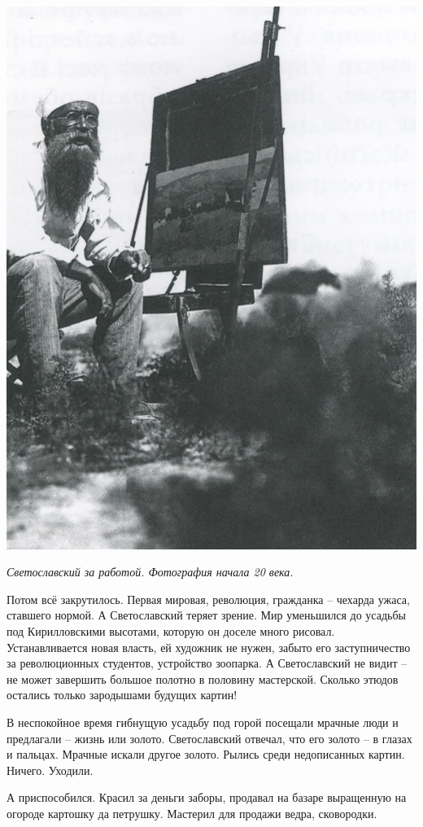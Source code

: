 \begin{center}
\includegraphics[width=0.80\linewidth]{chast-kirvys/svetosl/sveto-port.jpg}

\textit{Светославский за работой. Фотография начала 20 века.}
\end{center}

\newpage

Потом всё закрутилось. Первая мировая, революция, гражданка – чехарда ужаса, ставшего нормой. А Светославский теряет зрение. Мир уменьшился до усадьбы под Кирилловскими высотами, которую он доселе много рисовал. Устанавливается новая власть, ей художник не нужен, забыто его заступничество за революционных студентов, устройство зоопарка. А Светославский не видит – не может завершить большое полотно в половину мастерской. Сколько этюдов остались только зародышами будущих картин!

В неспокойное время гибнущую усадьбу под горой посещали мрачные люди и предлагали – жизнь или золото. Светославский отвечал, что его золото – в глазах и пальцах. Мрачные искали другое золото. Рылись среди недописанных картин. Ничего. Уходили.

А приспособился. Красил за деньги заборы, продавал на базаре выращенную на огороде картошку да петрушку. Мастерил для продажи ведра, сковородки.

